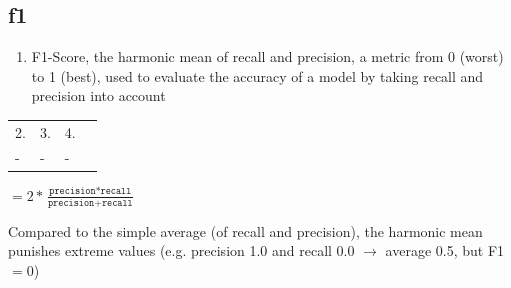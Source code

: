 \documentclass[12pt,a4paper]{article}
\begin{document}
\subsection{f1}
\begin{enumerate}
\item F1-Score, the harmonic mean of recall and precision, a metric from 0 (worst) to 1 (best), used to evaluate the accuracy of a model by taking recall and precision into account 
\end{enumerate}
\begin{tabular}{|l|l|l|l|}
\hline
2. & 3. & 4.\\ 
- & - & - \\ \hline
\end{tabular}
\begin{description}
\item $=2*\frac{\texttt{precision} * \texttt{recall}}{\texttt{precision}+\texttt{recall}}$
\item Compared to the simple average (of recall and precision), the harmonic mean punishes extreme values (e.g. precision 1.0 and recall 0.0 $\rightarrow$ average 0.5, but F1 $= 0$)
\end{description}
%
\end{document}

